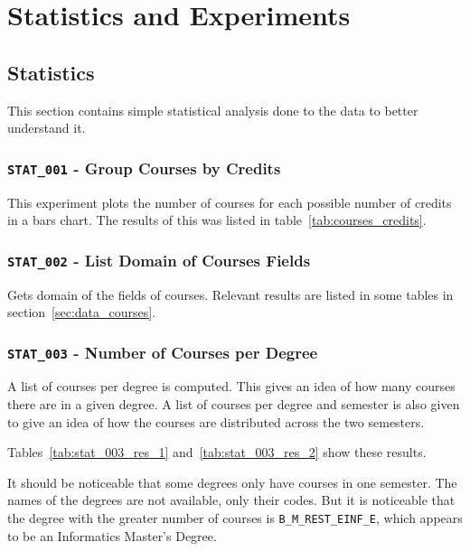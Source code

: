 \chapter{Statistics and Experiments}

\section{Statistics}

This section contains simple statistical analysis done to the data to better
understand it.

\subsection{\texttt{STAT\_001} - Group Courses by Credits}

This experiment plots the number of courses for each possible number of credits
in a bars chart. The results of this was listed in
table~\ref{tab:courses_credits}.

\subsection{\texttt{STAT\_002} - List Domain of Courses Fields}

Gets domain of the fields of courses. Relevant results are listed in some
tables in section~\ref{sec:data_courses}.

\subsection{\texttt{STAT\_003} - Number of Courses per Degree}

A list of courses per degree is computed. This gives an idea of how many
courses there are in a given degree. A list of courses per degree and semester
is also given to give an idea of how the courses are distributed across the two
semesters.

Tables~\ref{tab:stat_003_res_1} and~\ref{tab:stat_003_res_2} show these results.

It should be noticeable that some degrees only have courses in one semester.
The names of the degrees are not available, only their codes. But it is
noticeable that the degree with the greater number of courses is
\texttt{B\_M\_REST\_EINF\_E}, which appears to be an Informatics Master's
Degree.

